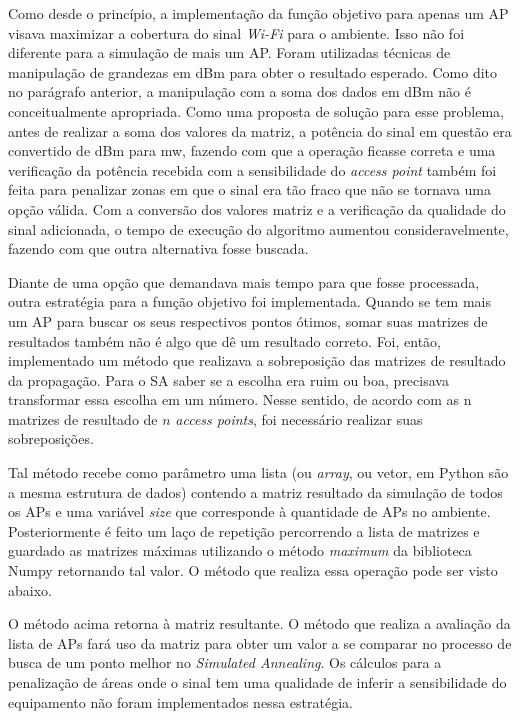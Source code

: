 \documentclass[
	12pt,				%
	openright,			%
	twoside,			%
	a4paper,			%
	english,			%
	french,				%
	spanish,			%
	brazil				%
	]{abntex2}
\begin{document}
Como desde o princípio, a implementação da função objetivo para apenas um AP visava maximizar a cobertura do sinal \textit{Wi-Fi} para o ambiente. Isso não foi diferente para a simulação de mais um AP. Foram utilizadas técnicas de manipulação de grandezas em dBm para obter o resultado esperado. Como dito no parágrafo anterior, a manipulação com a soma dos dados em dBm não é conceitualmente apropriada. Como uma proposta de solução para esse problema, antes de realizar a soma dos valores da matriz, a potência do sinal em questão era convertido de dBm para mw, fazendo com que a operação ficasse correta e uma verificação da potência recebida com a sensibilidade do \textit{access point} também foi feita para penalizar zonas em que o sinal era tão fraco que não se tornava uma opção válida. Com a conversão dos valores matriz e a verificação da qualidade do sinal adicionada, o tempo de execução do algoritmo aumentou consideravelmente, fazendo com que outra alternativa fosse buscada.

Diante de uma opção que demandava mais tempo para que fosse processada, outra estratégia para a função objetivo foi implementada. Quando se tem mais um AP para buscar os seus respectivos pontos ótimos, somar suas matrizes de resultados também não é algo que dê um resultado correto. Foi, então, implementado um método que realizava a sobreposição das matrizes de resultado da propagação. Para o SA saber se a escolha era ruim ou boa, precisava transformar essa escolha em um número. Nesse sentido, de acordo com as n matrizes de resultado de $ \textit{n} $ \textit{access points}, foi necessário realizar suas sobreposições.

Tal método recebe como parâmetro uma lista (ou \textit{array}, ou vetor, em Python são a mesma estrutura de dados) contendo a matriz resultado da simulação de todos os APs e uma variável \textit{size} que corresponde à quantidade de APs no ambiente. Posteriormente é feito um laço de repetição percorrendo a lista de matrizes e guardado as matrizes máximas utilizando o método \textit{maximum} da biblioteca Numpy retornando tal valor. O método que realiza essa operação pode ser visto abaixo.


%

O método acima retorna à matriz resultante. O método que realiza a avaliação da lista de APs fará uso da matriz para obter um valor a se comparar no processo de busca de um ponto melhor no \textit{Simulated Annealing}. Os cálculos para a penalização de áreas onde o sinal tem uma qualidade de inferir a sensibilidade do equipamento não foram implementados nessa estratégia. 
\end{document}

